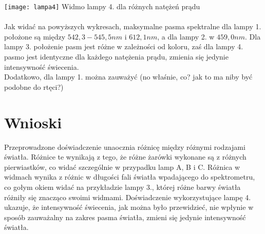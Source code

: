 \documentclass[10pt,a4paper]{article}
\newcommand{\forceindent}{\leavevmode{\parindent=3em\indent}}
\begin{document}
\texttt{[image: lampa4]}
Widmo lampy 4. dla różnych natężeń prądu\\
\\

\forceindent Jak widać na powyższych wykresach, maksymalne pasma spektralne dla lampy 1. położone są między $ 542,3 - 545,5 nm$ i $612,1 nm$, a dla lampy 2. w $459,0 nm$.
Dla lampy 3. położenie pasm jest różne w zależności od koloru, zaś dla lampy 4. pasmo jest identyczne dla każdego natężenia prądu, zmienia się jedynie intensywność świecenia.\\

Dodatkowo, dla lampy 1. można zauważyć (no właśnie, co? jak to ma niby być podobne do rtęci?)

\section*{Wnioski}
\forceindent Przeprowadzone doświadczenie unaocznia różnicę między różnymi rodzajami światła. Różnice te wynikają z tego, że różne żarówki wykonane są z różnych pierwiastków, co
widać szczególnie w przypadku lamp A, B i C. Różnica w widmach wynika z różnic w długości fali światła wpadającego do spektrometru, co gołym okiem widać na przykładzie lampy 3., 
której różne barwy światła różniły się znacząco swoimi widmami. Doświadczenie wykorzystujące lampę 4. ukazuje, że intensywność świecenia, jak można było przewidzieć, 
nie wpłynie w sposób zauważalny na zakres pasma światła, zmieni się jedynie intensywność światła.
\end{document}
